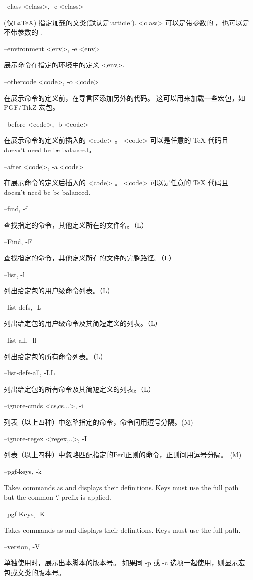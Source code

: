 \documentclass{article}
\newenvironment{options}{%
    \def\cstart{\begingroup\ttfamily\par\noindent\ignorespaces}%
    \def\csep{\endgroup\begingroup\list {}{}\item \relax}%
    \def\cend{\endlist\par\medskip\endgroup\cstart}%
    \cstart
}{%
    \endgroup
}
\begin{document}
\begin{options}
  
  --class \MacroArgs<class>, -c \MacroArgs<class>    \csep (仅LaTeX) 指定加载的文类(默认是`article').
                                                       \MacroArgs<class> 可以是带参数的 \MacroArgs[<参数>]，也可以是不带参数的 .\cend
  --environment \MacroArgs<env>, -e \MacroArgs<env>  \csep 展示命令在指定的环境中的定义 \MacroArgs<env>.\cend
  --othercode \MacroArgs<code>, -o \MacroArgs<code>  \csep 在展示命令的定义前，在导言区添加另外的代码。
                                                       这可以用来加载一些宏包，如 PGF/TikZ 宏包。\cend
  --before \MacroArgs<code>, -b \MacroArgs<code>     \csep 在展示命令的定义前插入的 \MacroArgs<code> 。
                                                       \MacroArgs<code> 可以是任意的 TeX 代码且 doesn't need be be balanced。\cend
  --after  \MacroArgs<code>, -a \MacroArgs<code>     \csep 在展示命令的定义后插入的 \MacroArgs<code> 。
                                                       \MacroArgs<code> 可以是任意的 TeX 代码且 doesn't need be be balanced.\cend
  --find, -f                                         \csep 查找指定的命令，其他定义所在的文件名。（L）\cend
  --Find, -F                                         \csep 查找指定的命令，其他定义所在的文件的完整路径。（L）\cend
  --list, -l                                         \csep 列出给定包的用户级命令列表。（L）\cend
  --list-defs, -L                                    \csep 列出给定包的用户级命令及其简短定义的列表。（L）\cend
  --list-all, -ll                                    \csep 列出给定包的所有命令列表。（L）\cend
  --list-defs-all, -LL                               \csep 列出给定包的所有命令及其简短定义的列表。（L）\cend
  --ignore-cmds \MacroArgs<cs,cs,..>,  -i            \csep 列表（以上四种）中忽略指定的命令，命令间用逗号分隔。(M)\cend
  --ignore-regex \MacroArgs<regex,..>, -I            \csep 列表（以上四种）中忽略匹配指定的Perl正则的命令，正则间用逗号分隔。 (M)\cend
  --pgf-keys, -k                                     \csep Takes commands as  and displays their definitions. Keys must use the full path but the common `.\@cmd' prefix is applied.\cend
  --pgf-Keys, -K                                     \csep Takes commands as  and displays their definitions. Keys must use the full path.\cend
  --version, -V                                      \csep 单独使用时，展示出本脚本的版本号。
                                                       如果同 -p 或 -c 选项一起使用，则显示宏包或文类的版本号。\cend

\end{options}
\end{document}

